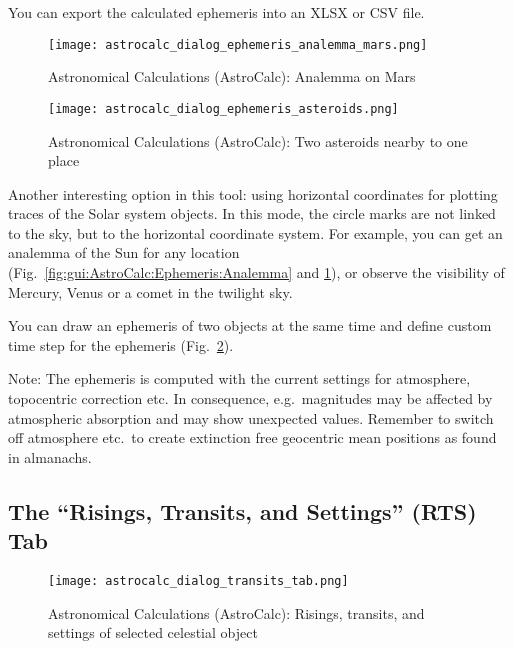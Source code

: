 You can export the calculated ephemeris into an XLSX or CSV file. 

\begin{figure}[p]
	\centering\texttt{[image: astrocalc\_dialog\_ephemeris\_analemma\_mars.png]}
	\caption{Astronomical Calculations (AstroCalc): Analemma on Mars}
	\label{fig:gui:AstroCalc:Ephemeris:AnalemmaMars}
\end{figure}

\begin{figure}[p]
	\centering\texttt{[image: astrocalc\_dialog\_ephemeris\_asteroids.png]}
	\caption{Astronomical Calculations (AstroCalc): Two asteroids nearby to one place}
	\label{fig:gui:AstroCalc:Ephemeris:Asteroids}
\end{figure}

Another interesting option in this tool: using horizontal coordinates for plotting traces of the Solar system objects. 
In this mode, the circle marks are not linked to the sky, but to the horizontal coordinate system.
For example, you can get an analemma of the Sun for any location (Fig.~\ref{fig:gui:AstroCalc:Ephemeris:Analemma}
and \ref{fig:gui:AstroCalc:Ephemeris:AnalemmaMars}), 
or observe the visibility of Mercury, Venus or a comet in the twilight sky.

You can   draw an ephemeris of 
two objects at the same time and define custom time step for the ephemeris 
(Fig.~\ref{fig:gui:AstroCalc:Ephemeris:Asteroids}).

Note: The ephemeris is computed with the current settings for atmosphere, topocentric correction etc. 
In consequence, e.g.\ magnitudes may be affected by atmospheric absorption and may show unexpected values. 
Remember to switch off atmosphere etc.\ to create extinction free geocentric mean positions as found in almanachs.

\subsection{The ``Risings, Transits, and Settings'' (RTS) Tab}
\label{sec:gui:AstroCalc:RTS}

\begin{figure}[htbp]
	\centering\texttt{[image: astrocalc\_dialog\_transits\_tab.png]}
	\caption{Astronomical Calculations (AstroCalc): Risings, transits, and settings of selected celestial object}
	\label{fig:gui:AstroCalc:RTS}
\end{figure}

